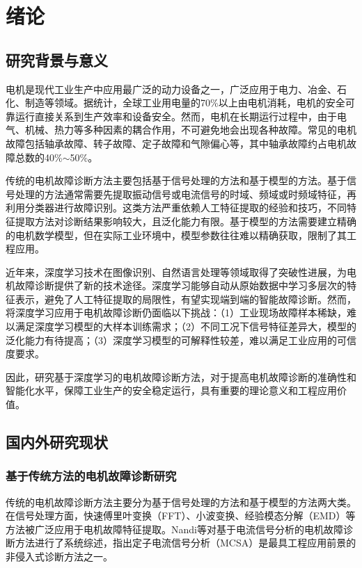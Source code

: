\chapter{绪论}

\section{研究背景与意义}

电机是现代工业生产中应用最广泛的动力设备之一，广泛应用于电力、冶金、石化、制造等领域。据统计，全球工业用电量的70\%以上由电机消耗，电机的安全可靠运行直接关系到生产效率和设备安全\cite{nandi2005condition}。然而，电机在长期运行过程中，由于电气、机械、热力等多种因素的耦合作用，不可避免地会出现各种故障。常见的电机故障包括轴承故障、转子故障、定子故障和气隙偏心等，其中轴承故障约占电机故障总数的40\%$\sim$50\%\cite{zhang2020bearing}。

传统的电机故障诊断方法主要包括基于信号处理的方法和基于模型的方法。基于信号处理的方法通常需要先提取振动信号或电流信号的时域、频域或时频域特征，再利用分类器进行故障识别。这类方法严重依赖人工特征提取的经验和技巧，不同特征提取方法对诊断结果影响较大，且泛化能力有限\cite{lei2020applications}。基于模型的方法需要建立精确的电机数学模型，但在实际工业环境中，模型参数往往难以精确获取，限制了其工程应用。

近年来，深度学习技术在图像识别、自然语言处理等领域取得了突破性进展，为电机故障诊断提供了新的技术途径。深度学习能够自动从原始数据中学习多层次的特征表示，避免了人工特征提取的局限性，有望实现端到端的智能故障诊断\cite{zhao2019deep}。然而，将深度学习应用于电机故障诊断仍面临以下挑战：（1）工业现场故障样本稀缺，难以满足深度学习模型的大样本训练需求；（2）不同工况下信号特征差异大，模型的泛化能力有待提高；（3）深度学习模型的可解释性较差，难以满足工业应用的可信度要求。

因此，研究基于深度学习的电机故障诊断方法，对于提高电机故障诊断的准确性和智能化水平，保障工业生产的安全稳定运行，具有重要的理论意义和工程应用价值。

\section{国内外研究现状}

\subsection{基于传统方法的电机故障诊断研究}

传统的电机故障诊断方法主要分为基于信号处理的方法和基于模型的方法两大类。在信号处理方面，快速傅里叶变换（FFT）、小波变换、经验模态分解（EMD）等方法被广泛应用于电机故障特征提取。Nandi等\cite{nandi2005condition}对基于电流信号分析的电机故障诊断方法进行了系统综述，指出定子电流信号分析（MCSA）是最具工程应用前景的非侵入式诊断方法之一。

